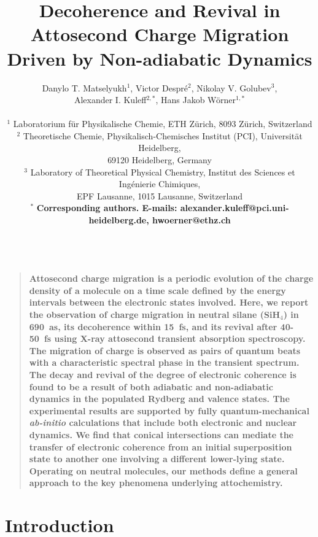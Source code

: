 \documentclass[12pt]{article}
\title{\vspace{-3cm}Decoherence and Revival in Attosecond Charge Migration Driven by Non-adiabatic Dynamics}
\author
{Danylo T. Matselyukh$^1$, Victor Despr\'e$^2$, Nikolay V. Golubev$^3$, \\
Alexander I. Kuleff$^{2,\ast}$, Hans Jakob W{\"o}rner$^{1,\ast}$\\
 \\
\normalsize{$^{1}$ Laboratorium f\"{u}r Physikalische Chemie, ETH Z\"{u}rich, 8093 Z\"{u}rich, Switzerland}\\
\normalsize{$^{2}$ Theoretische Chemie, Physikalisch-Chemisches Institut (PCI), Universit\"at Heidelberg,}\\
\normalsize{69120 Heidelberg, Germany}\\
\normalsize{$^{3}$ Laboratory of Theoretical Physical Chemistry, Institut des Sciences et Ing\'enierie Chimiques,}\\
\normalsize{EPF Lausanne, 1015 Lausanne, Switzerland}\\
\normalsize{$^\ast$ \textbf{Corresponding authors. E-mails: alexander.kuleff@pci.uni-heidelberg.de, hwoerner@ethz.ch}}\\
\\
}
\date{}
\newenvironment{sciabstract}{%
\begin{quote} \bf}
{\end{quote}}
\begin{document}
\baselineskip24pt

\maketitle



\begin{sciabstract}
Attosecond charge migration is a periodic evolution of the charge density of a molecule on a time scale defined by the energy intervals between the electronic states involved. Here, we report the observation of charge migration in neutral silane (SiH$_4$) in 690~as, its decoherence within 15~fs, and its revival after 40-50~fs using X-ray attosecond transient absorption spectroscopy. The migration of charge is observed as pairs of quantum beats with a characteristic spectral phase in the transient spectrum. The decay and revival of the degree of electronic coherence is found to be a result of both adiabatic and non-adiabatic dynamics in the populated Rydberg and valence states. The experimental results are supported by fully quantum-mechanical {\it ab-initio} calculations that include both electronic and nuclear dynamics. We find that conical intersections can mediate the transfer of electronic coherence from an initial superposition state to another one involving a different lower-lying state. Operating on neutral molecules, our methods define a general approach to the key phenomena underlying attochemistry.
\end{sciabstract}

\newpage

\section{Introduction}
\end{document}
